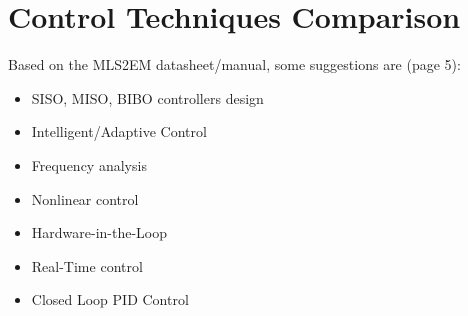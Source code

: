 \section{Control Techniques Comparison}
\label{sec:control_techniques_comparison}

Based on the MLS2EM datasheet/manual, some suggestions are (page 5):

\begin{itemize}
    \item SISO, MISO, BIBO controllers design
    \item Intelligent/Adaptive Control
    \item Frequency analysis
    \item Nonlinear control
    \item Hardware-in-the-Loop
    \item Real-Time control
    \item Closed Loop PID Control
\end{itemize}
